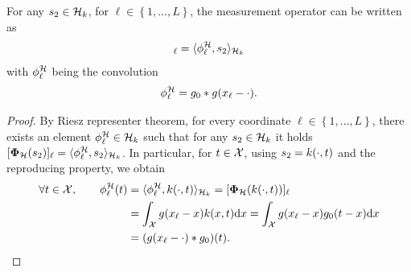 \documentclass[12pt]{article}
\begin{document}
            {
            \begin{proposition}
                \label{prop:phihh}
                For any $s_2 \in \mathcal{H}_k$, for $\ell \in \left\{ 1, \dots, L \right\}$, the measurement operator can be written as
                \begin{equation}
                    [\phih(\fh)]_\ell = \langle \phihh_\ell, \fh \rangle_{\cHk}
                \end{equation}
                with $\phi^\mathcal{H}_\ell$ being the convolution
                \begin{equation}
                    \phi^\mathcal{H}_\ell = g_0 * g(x_\ell - \cdot).
                \end{equation}
            \end{proposition}
            \begin{proof}
                

                By Riesz representer theorem, for every coordinate  $\ell \in \left\{1, \dots, L \right\}$, there exists an element $\phi^\mathcal{H}_\ell \in \mathcal{H}_k$ such that for any $s_2 \in \mathcal{H}_k$ it holds $[\bm{\Phi}_\mathcal{H}(s_2)]_\ell = \langle \phi^\mathcal{H}_\ell , s_2 \rangle_{\mathcal{H}_k}$. In particular, for $t \in \mathcal{X}$, using $s_2 = k(\cdot, t)$ and the reproducing property, we obtain
                \begin{align*}
                    \forall t \in \mathcal{X}, \qquad \phi^\mathcal{H}_\ell(t)
                    &= \langle \phi^\mathcal{H}_\ell, k(\cdot, t) \rangle_{\mathcal{H}_k} = [\bm{\Phi}_\mathcal{H}(k(\cdot, t))]_\ell \\
                    & = \int_{\mathcal{X}} g(x_\ell - x) k(x, t) \mathrm{d}x = \int_{\mathcal{X}} g(x_\ell - x) g_0(t - x) \mathrm{d}x \\
                    & = (g(x_\ell - \cdot) * g_0)(t).
                \end{align*}   
            \end{proof}
            }
            
\end{document}
